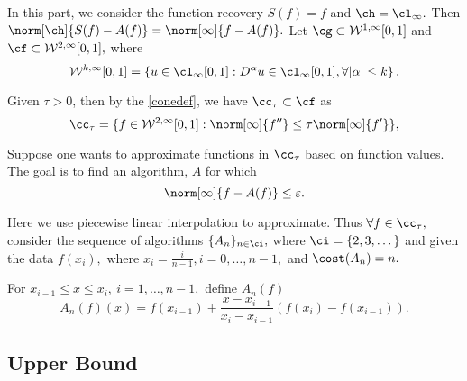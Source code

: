 
In this part, we consider the function recovery $S(f)=f$ and $\ch=\cl_{\infty}.$
Then $\norm[\ch]{S(f)-A(f)}=\norm[\infty]{f-A(f)}.$
Let $\cg \subset \mathcal{W}^{1,\infty}[0,1]$ and $\cf \subset \mathcal{W}^{2,\infty}[0,1],$ where
$$\mathcal{W}^{k,\infty}[0,1]=\left\{u \in \cl_{\infty}[0,1]:D^\alpha u \in \cl_\infty[0,1], \forall |\alpha| \leq k \right\}.$$

Given $\tau>0$, then by the \eqref{conedef}, we have $\cc_{\tau} \subset \cf$ as
\begin{equation}\label{taudef}
\cc_{\tau}=\{f \in  \mathcal{W}^{2,\infty}[0,1] : \norm[\infty]{f''}\leq \tau\norm[\infty]{f'}\},
\end{equation}

Suppose one wants to approximate functions in $\cc_{\tau}$ based on function values.  The goal is to find an algorithm, $A$ for which $$\norm[\infty]{f-A(f)} \le \varepsilon.$$

Here we use piecewise linear interpolation to approximate. Thus $\forall f \in \cc_{\tau},$ consider the sequence of algorithms $\{A_n\}_{n \in \ci},$ where
$\ci=\{2,3,\dots\}$
 and given the data $f(x_i),$ where $ x_i=\frac{i}{n-1}, i=0, \ldots,n-1,$ and $\cost(A_{n})=n.$

For $x_{i-1} \leq x \leq x_i, \ i=1, \ldots, n-1,$ define $A_{n}(f)$
$$A_{n}(f)(x)=f(x_{i-1})+\frac{x-x_{i-1}}{x_i-x_{i-1}}\left(f(x_i)-f(x_{i-1})\right).$$


\subsection{Upper Bound}

